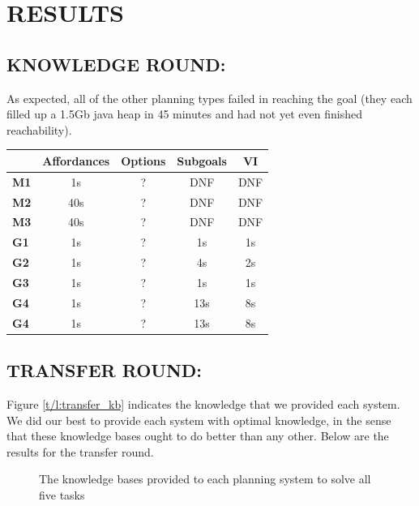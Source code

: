 \documentclass[]{article}
\begin{document}
\section{RESULTS}

\subsection{KNOWLEDGE ROUND:}

As expected, all of the other planning types failed in reaching the goal (they each filled up a 1.5Gb java heap in 45 minutes and had not yet even finished reachability).

\begin{tabular}{ l || c | c | c | c }
  & Affordances & Options & Subgoals & VI \\
  \hline
  {\bf M1} & 1s & ? & DNF & DNF  \\
  {\bf M2} & 40s & ? & DNF & DNF \\
  {\bf M3} & 40s & ? & DNF & DNF \\
  {\bf G1} & 1s & ? & 1s & 1s \\
  {\bf G2} & 1s & ? & 4s & 2s \\
  {\bf G3} & 1s & ? & 1s & 1s \\
  {\bf G4} & 1s & ? & 13s & 8s \\
  {\bf G4} & 1s & ? & 13s & 8s \\
\end{tabular}


\subsection{TRANSFER ROUND:}

Figure \ref{t/l:transfer_kb} indicates the knowledge that we provided each system. We did our best to provide each system with optimal knowledge, in the sense that these knowledge bases ought to do better than any other. Below are the results for the transfer round.

\begin{figure}
\centering
{}
\caption{The knowledge bases provided to each planning system to solve all five tasks \label{tbl:transfer_kb}}
\end{figure}
\end{document}
